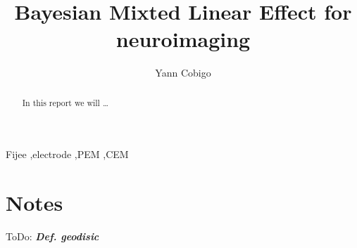 \documentclass[final, paper=letter,5p,times,twocolumn]{elsarticle}
\newcommand{\ToDo}[1]{ToDo: \textbf{\textit{#1}}}
\theoremstyle{definition}
\begin{document}
\begin{frontmatter}

\title{Bayesian Mixted Linear Effect for neuroimaging}

\author[label1]{Yann Cobigo}
\address[label1]{University of California, San Francisco | ucsf.edu}




\begin{abstract}
In this report we will \dots
\end{abstract}

\begin{keyword}
Fijee \sep electrode \sep PEM \sep CEM
\end{keyword}

\end{frontmatter}


\section{Notes}

\ToDo{Def. geodisic} \\


\end{document}
